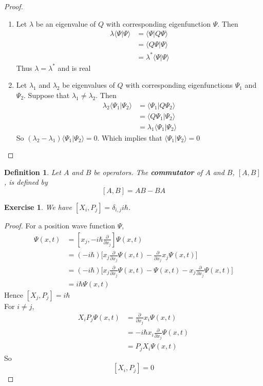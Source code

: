 \documentclass[12pt]{amsart}
\newtheorem{defn}[thm]{Definition}
\newtheorem{ex}[thm]{Exercise}
\renewcommand{\r}{\rangle}
\renewcommand{\l}{\langle}
\newcommand{\del}{\delta}
\newcommand{\lam}{\lambda}
\newcommand{\p}[1]{\frac{\partial}{\partial{#1}}}
\begin{document}
\begin{proof}
\ \begin{enumerate}
\item Let $\lam$ be an eigenvalue of $Q$ with corresponding eigenfunction $\Psi$. Then 
\begin{align*}
 \lam \l \Psi \vert \Psi\r
&= \l \Psi \vert Q \Psi\r \\
&= \l Q \Psi \vert \Psi\r \\
&= \lam^* \l \Psi \vert \Psi\r
\end{align*}
Thus $\lam = \lam^*$ and is real

\item Let $\lam_1$ and $\lam_2$ be eigenvalues of $Q$ with corresponding eigenfunctions $\Psi_1$ and $\Psi_2$. Suppose that $\lam_1 \neq \lam_2$. Then 
\begin{align*}
\lam_2 \l \Psi_1 \vert  \Psi_2\r
&= \l \Psi_1 \vert Q \Psi_2\r\\
&= \l Q \Psi_1 \vert  \Psi_2\r\\
&= \lam_1 \l \Psi_1 \vert  \Psi_2\r
\end{align*}
So $(\lam_2 - \lam_1)\l \Psi_1 \vert  \Psi_2\r = 0$. Which implies that $\l \Psi_1 \vert  \Psi_2\r=0$
\end{enumerate}
\end{proof}

\begin{defn}
Let $A$ and $B$ be operators. The \textbf{commutator} of $A$ and $B$, $[A,B]$, is defined by $$[A,B] = AB - BA$$
\end{defn}

\begin{ex}
We have $[X_i, P_j] = \del_{i,j}i\hbar$.
\end{ex}

\begin{proof}
For a position wave function $\Psi$, 
\begin{align*}
[X_j, P_j]\Psi(x,t)
&= [x_j, -i\hbar \p{x_j}]\Psi(x,t)\\
&= (-i\hbar) \bigg[x_j \p{x_j}\Psi(x,t)- \p{x_j}x_j\Psi(x,t)\bigg]\\
&= (-i\hbar)\bigg[ x_j \p{x_j}\Psi(x,t)- \Psi(x,t) - x_j \p{x_j}\Psi(x,t)\bigg]\\
&=i\hbar \Psi(x,t)
\end{align*}
Hence $[X_j, P_j] = i\hbar$\vspace{.5cm}\\
For $i\neq j$, 
\begin{align*}
X_iP_j \Psi(x,t)
&= \p{x_j}x_i \Psi(x,t)\\
& = -i \hbar x_i \p{x_j}\Psi(x,t) \\
&= P_jX_i \Psi(x,t)
\end{align*}
So $$[X_i,P_j] =0 $$
\end{proof}
\end{document}
